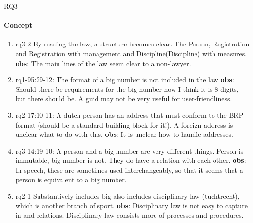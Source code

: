 \def\rq{RQ3}

\acrlong{\rq}

\paragraph{Concept}
\begin{enumerate}
    \item rq3-2 By reading the law, a structure becomes clear.
    The  \mbox{Person}, \mbox{Registration} and \mbox{Registration} with management and Discipline(Discipline) with measures.
    \newline\textbf{obs}: The main lines of the law seem clear to a non-lawyer.

    \item rq1-95:29-12: The format of a  big number is not included in the law
    \newline\textbf{obs}: Should there be requirements for the big number now I think it is 8 digits, but there should be.
    A guid may not be very useful for user-friendliness.

    \item rq2-17:10-11: A dutch person has an  address that must conform to the BRP format (should be a standard building block for it!).
    A foreign address is unclear what to do with this.
    \newline\textbf{obs}: It is unclear how to handle addresses.

    \item rq3-14:19-10: A  person and a big number are very different things.
    Person is immutable, big number is not.
    They do have a {relation} with each other.
    \newline\textbf{obs}: In speech, these are sometimes used interchangeably, so that it seems that a person is equivalent to a big number.
    
    \item rq2-1 Substantively includes \acrshort{big} also includes disciplinary law (tuchtrecht), which is another branch of sport.
    \newline\textbf{obs}: Disciplinary law is not easy to capture in  and {relation}s.
    Disciplinary law consists more of processes and procedures.

\end{enumerate}


